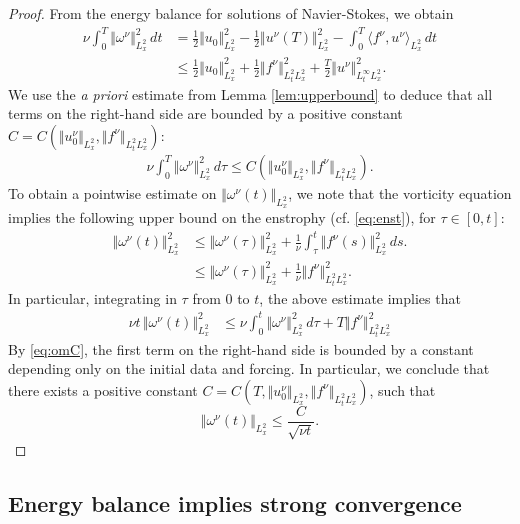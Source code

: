 \documentclass[reqno,12pt]{amsart}
\begin{document}
\begin{proof}
  From the energy balance for solutions of Navier-Stokes, we obtain
  \begin{align*}
\nu \int_0^T \Vert \omega^\nu \Vert^2_{L^2_x} \, dt
&=
\frac12 \Vert u_0 \Vert^2_{L^2_x} - \frac12 \Vert u^\nu(T) \Vert_{L^2_x}^2 - \int_0^T \langle f^\nu, u^\nu \rangle_{L^2_x} \, dt
\\
&\le
\frac12 \Vert u_0 \Vert^2_{L^2_x} + \frac12 \Vert f^\nu \Vert_{L^2_tL^2_x}^2 + \frac{T}{2}  \Vert u^\nu \Vert_{L^\infty_t L^2_x}^2.
\end{align*}
  We use the {\it a priori} estimate from Lemma \ref{lem:upperbound} to deduce that all terms on the right-hand side are bounded by a positive constant $C = C(\Vert u^\nu_0 \Vert_{L^2_x},\Vert f^\nu \Vert_{L^2_tL^2_x})$:
  \begin{align} \label{eq:omC}
    \nu \int_0^T \Vert \omega^\nu \Vert^2_{L^2_x} \, d\tau
    \le
    C(\Vert u^\nu_0 \Vert_{L^2_x},\Vert f^\nu \Vert_{L^2_tL^2_x}).
  \end{align}
  To obtain a pointwise estimate on $\Vert \omega^\nu(t) \Vert_{L^2_x}$, we note that the vorticity equation implies the following upper bound on the enstrophy (cf. \eqref{eq:enst}), for $\tau \in [0,t]$:
  \begin{align*}
    \Vert \omega^\nu(t) \Vert_{L^2_x}^2
    &\le
    \Vert \omega^\nu(\tau) \Vert_{L^2_x}^2
    + \frac{1}{\nu} \int_\tau^t \Vert f^\nu(s) \Vert_{L^2_x}^2 \, ds.
    \\
      &\le
    \Vert \omega^\nu(\tau) \Vert_{L^2_x}^2
    + \frac{1}{\nu} \Vert f^\nu \Vert_{L^2_t L^2_x}^2.
\end{align*}
  In particular, integrating in $\tau$ from $0$ to $t$, the above estimate implies that
  \begin{align*}
    \nu t \, \Vert \omega^\nu(t) \Vert_{L^2_x}^2
    &\le
    \nu \int_0^t \Vert \omega^\nu \Vert_{L^2_x}^2 \, d\tau + T \Vert f^\nu \Vert_{L^2_tL^2_x}^2
  \end{align*}
  By \eqref{eq:omC}, the first term on the right-hand side is bounded by a constant depending only on the initial data and forcing. In particular, we conclude that there exists a positive constant $C = C(T,\Vert u^\nu_0 \Vert_{L^2_x},\Vert f^\nu \Vert_{L^2_tL^2_x})$, such that
  \[
  \Vert \omega^\nu(t) \Vert_{L^2_x} \le \frac{C}{\sqrt{\nu t}}.
  \]
\end{proof}

\subsection{Energy balance implies strong convergence}
\label{sec:ebal-->conv}
\end{document}
